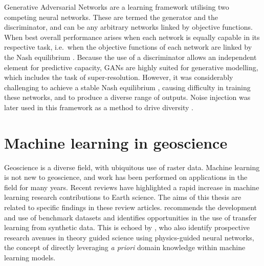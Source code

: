Generative Adversarial Networks \parencite{goodfellowGenerativeAdversarialNets2014} are a learning framework utilising two competing neural networks.
These are termed the generator and the discriminator, and can be any arbitrary networks linked by objective functions.
When best overall performance arises when each network is equally capable in its respective task, i.e.\ when the objective functions of each network are linked by the Nash equilibrium \parencite{salimansImprovedTechniquesTraining2016,lucicAreGANsCreated2018}.
Because the use of a discriminator allows an independent element for predictive capacity, GANs are highly suited for generative modelling, which includes the task of super-resolution.
However, it was considerably challenging to achieve a stable Nash equilibrium \parencite{salimansImprovedTechniquesTraining2016}, causing difficulty in training these networks, and to produce a diverse range of outputs.
Noise injection was later used in this framework as a method to drive diversity \parencite{karrasStylebasedGeneratorArchitecture2018,rakotonirinaESRGANFurtherImproving2020}.



\section{Machine learning in geoscience}
\label{sec:introgeoml}

Geoscience is a diverse field, with ubiquitous use of raster data.
Machine learning is not new to geoscience, and work has been performed on applications in the field for many years.
Recent reviews have highlighted a rapid increase in machine learning research contributions to Earth science.
The aims of this thesis are related to specific findings in these review articles.
\textcite{bergenMachineLearningDatadriven2019} recommends the development and use of benchmark datasets and identifies opportunities in the use of transfer learning from synthetic data.
This is echoed by \textcite{karpatneMachineLearningGeosciences2019}, who also identify prospective research avenues in theory guided science using physics-guided neural networks, the concept of directly leveraging \emph{a priori} domain knowledge within machine learning models.

